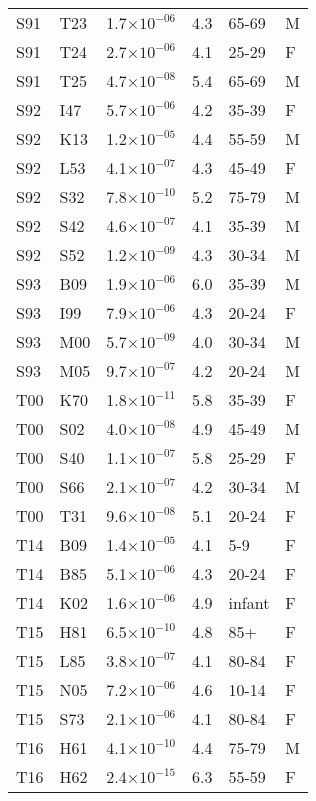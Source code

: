 \begin{longtable}{lllrll}
   S91 & T23 & 1.7$\times10^{-06}$ & 4.3 & 65-69 & M \\ 
   S91 & T24 & 2.7$\times10^{-06}$ & 4.1 & 25-29 & F \\ 
   S91 & T25 & 4.7$\times10^{-08}$ & 5.4 & 65-69 & M \\ 
   S92 & I47 & 5.7$\times10^{-06}$ & 4.2 & 35-39 & F \\ 
   S92 & K13 & 1.2$\times10^{-05}$ & 4.4 & 55-59 & M \\ 
   S92 & L53 & 4.1$\times10^{-07}$ & 4.3 & 45-49 & F \\ 
   S92 & S32 & 7.8$\times10^{-10}$ & 5.2 & 75-79 & M \\ 
   S92 & S42 & 4.6$\times10^{-07}$ & 4.1 & 35-39 & M \\ 
   S92 & S52 & 1.2$\times10^{-09}$ & 4.3 & 30-34 & M \\ 
   S93 & B09 & 1.9$\times10^{-06}$ & 6.0 & 35-39 & M \\ 
   S93 & I99 & 7.9$\times10^{-06}$ & 4.3 & 20-24 & F \\ 
   S93 & M00 & 5.7$\times10^{-09}$ & 4.0 & 30-34 & M \\ 
   S93 & M05 & 9.7$\times10^{-07}$ & 4.2 & 20-24 & M \\ 
   T00 & K70 & 1.8$\times10^{-11}$ & 5.8 & 35-39 & F \\ 
   T00 & S02 & 4.0$\times10^{-08}$ & 4.9 & 45-49 & M \\ 
   T00 & S40 & 1.1$\times10^{-07}$ & 5.8 & 25-29 & F \\ 
   T00 & S66 & 2.1$\times10^{-07}$ & 4.2 & 30-34 & M \\ 
   T00 & T31 & 9.6$\times10^{-08}$ & 5.1 & 20-24 & F \\ 
   T14 & B09 & 1.4$\times10^{-05}$ & 4.1 & 5-9 & F \\ 
   T14 & B85 & 5.1$\times10^{-06}$ & 4.3 & 20-24 & F \\ 
   T14 & K02 & 1.6$\times10^{-06}$ & 4.9 & infant & F \\ 
   T15 & H81 & 6.5$\times10^{-10}$ & 4.8 & 85+ & F \\ 
   T15 & L85 & 3.8$\times10^{-07}$ & 4.1 & 80-84 & F \\ 
   T15 & N05 & 7.2$\times10^{-06}$ & 4.6 & 10-14 & F \\ 
   T15 & S73 & 2.1$\times10^{-06}$ & 4.1 & 80-84 & F \\ 
   T16 & H61 & 4.1$\times10^{-10}$ & 4.4 & 75-79 & M \\ 
   T16 & H62 & 2.4$\times10^{-15}$ & 6.3 & 55-59 & F \\ 

\end{longtable}

